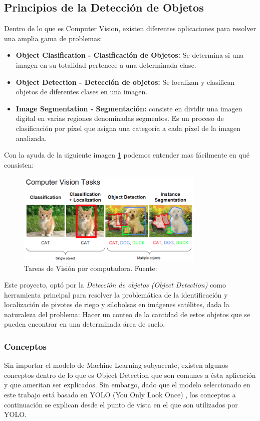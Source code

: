 \label{Principios de la Deteccion de Objetos}
\subsection{Principios de la Detección de Objetos}
Dentro de lo que es Computer Vision, existen diferentes aplicaciones para resolver una amplia gama de problemas:
\begin{itemize}
    \item \textbf{Object Clasification - Clasificación de Objetos:} Se determina si una imagen en su totalidad pertenece a una determinada clase.
    \item \textbf{Object Detection - Detección de objetos:} Se localizan y clasifican objetos de diferentes clases en una imagen. 
    \item \textbf{Image Segmentation - Segmentación:} consiste en dividir una imagen digital en varias regiones denominadas segmentos. Es un proceso de clasificación por píxel que asigna una categoría a cada píxel de la imagen analizada.
\end{itemize}

Con la ayuda de la siguiente imagen \ref{fig:computer vision} podemos entender mas fácilmente en qué consisten:

\begin{figure}[h!]
    \centering
    \includegraphics[width=0.8\textwidth]{img/computerVision.png}
    \caption{Tareas de Visión por computadora. Fuente: \cite{taskcompvision}}
    \label{fig:computer vision}
\end{figure}

\newpage
Este proyecto, optó por la \textit{Detección de objetos (Object Detection)} como herramienta principal para resolver la problemática de la identificación y localización de pivotes de riego y silobolsas en imágenes satélites, dada la naturaleza del problema: Hacer un conteo de la cantidad de estos objetos que se pueden encontrar en una determinada área de suelo.

\subsubsection{Conceptos}
Sin importar el modelo de Machine Learning subyacente, existen algunos conceptos dentro de lo que es Object Detection que son comunes a ésta aplicación y que ameritan ser explicados. Sin embargo, dado que el modelo seleccionado en este trabajo está basado en YOLO (You Only Look Once) \cite{yolo}, los conceptos a continuación se explican desde el punto de vista en el que son utilizados por YOLO.

